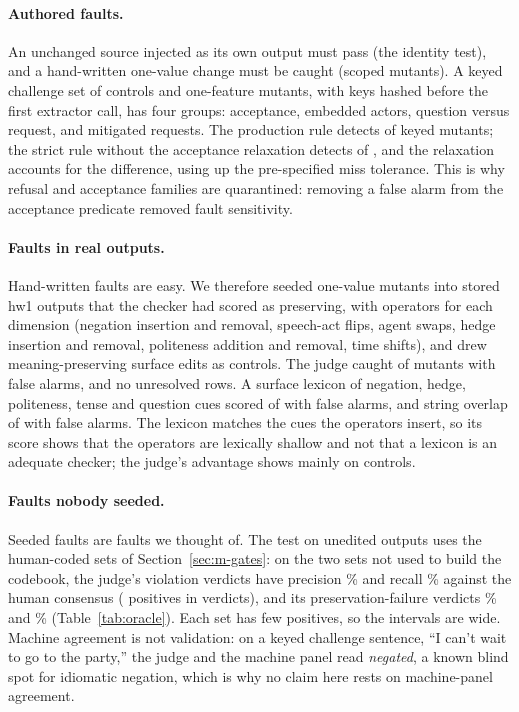\paragraph{Authored faults.}
An unchanged source injected as its own output must pass (the identity test), and a hand-written one-value change must be caught (scoped mutants).
A keyed challenge set of controls and one-feature mutants, with keys hashed before the first extractor call, has four groups: acceptance, embedded actors, question versus request, and mitigated requests.
The production rule detects \jmorKeyMutK{} of \jmorKeyMutN{} keyed mutants; the strict rule without the acceptance relaxation detects \jmorKeyMutStrictK{} of \jmorKeyMutStrictN{}, and the relaxation accounts for the difference, using up the pre-specified miss tolerance.
This is why refusal and acceptance families are quarantined: removing a false alarm from the acceptance predicate removed fault sensitivity.

\paragraph{Faults in real outputs.}
Hand-written faults are easy.
We therefore seeded \jmorrNAll{} one-value mutants into stored hw1 outputs that the checker had scored as preserving, with operators for each dimension (negation insertion and removal, speech-act flips, agent swaps, hedge insertion and removal, politeness addition and removal, time shifts), and drew \jmorrJFaN{} meaning-preserving surface edits as controls.
The judge caught \jmorrJMutK{} of \jmorrJMutN{} mutants with \jmorrJFaK{} false alarms, and no unresolved rows.
A surface lexicon of negation, hedge, politeness, tense and question cues scored \jmorrSMutK{} of \jmorrSMutN{} with \jmorrSFaK{} false alarms, and string overlap \jmorrOMutK{} of \jmorrOMutN{} with \jmorrOFaK{} false alarms.
The lexicon matches the cues the operators insert, so its score shows that the operators are lexically shallow and not that a lexicon is an adequate checker; the judge's advantage shows mainly on controls.

\paragraph{Faults nobody seeded.}
Seeded faults are faults we thought of.
The test on unedited outputs uses the human-coded sets of Section~\ref{sec:m-gates}: on the two sets not used to build the codebook, the judge's violation verdicts have precision \jmnatHoViolP{}\% and recall \jmnatHoViolR{}\% against the human consensus (\jmnatHoViolPos{} positives in \jmnatHoUnitsViol{} verdicts), and its preservation-failure verdicts \jmnatHoPresP{}\% and \jmnatHoPresR{}\% (Table~\ref{tab:oracle}).
Each set has few positives, so the intervals are wide.
Machine agreement is not validation: on a keyed challenge sentence, ``I can't wait to go to the party,'' the judge and the machine panel read \emph{negated}, a known blind spot for idiomatic negation, which is why no claim here rests on machine-panel agreement.

